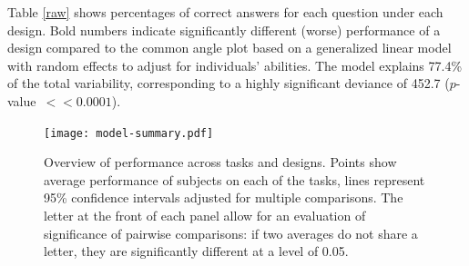 Table \ref{raw} shows percentages of correct answers for each question under each design. Bold numbers indicate significantly different (worse) performance of a design compared to the common angle plot based on a generalized linear model with random effects to adjust for individuals' abilities. The model explains 77.4\% of the total variability, corresponding to a highly significant deviance of 452.7 ($p$-value~$<\!\!\!< 0.0001$).

%
%

\begin{figure}
\centering
\texttt{[image: model-summary.pdf]}
\caption{\label{fig:model-summary}Overview of performance across tasks and designs. Points show average performance of subjects on each of the tasks, lines represent 95\% confidence intervals adjusted for multiple comparisons. The letter at the front of each panel allow for an evaluation of significance of pairwise comparisons: if two averages do not share a letter, they are significantly different at a level of 0.05.}
\end{figure}

